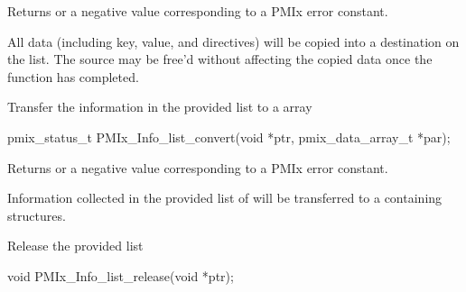 Returns  or a negative value corresponding to a PMIx error constant.

\descr

All data (including key, value, and directives) will be copied into a destination  on the list. The source  may be free'd without affecting the copied data once the function has completed.



\summary

Transfer the information in the provided  list to a  array

\format

\cspecificstart
\begin{codepar}
pmix_status_t
PMIx_Info_list_convert(void *ptr,
                       pmix_data_array_t *par);
\end{codepar}
\cspecificend


\begin{arglist}
\end{arglist}

Returns  or a negative value corresponding to a PMIx error constant.

\descr

Information collected in the provided list of  will be transferred to a  containing  structures.



\summary

Release the provided  list

\format

\cspecificstart
\begin{codepar}
void
PMIx_Info_list_release(void *ptr);
\end{codepar}
\cspecificend


\begin{arglist}
\end{arglist}

